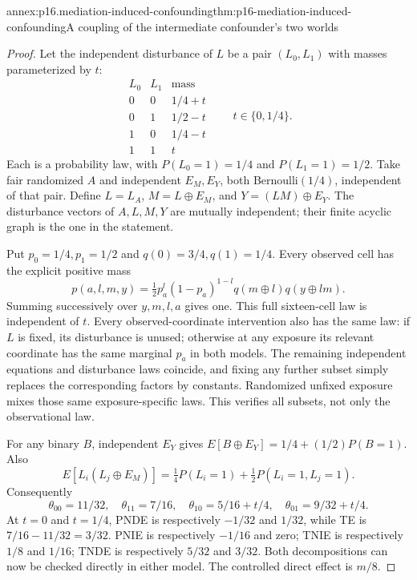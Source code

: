 \begin{annexitem}{annex:p16.mediation-induced-confounding}{thm:p16-mediation-induced-confounding}{A coupling of the intermediate confounder's two worlds}
\begin{proof}
Let the independent disturbance of \(L\) be a pair \((L_0,L_1)\)
with masses parameterized by \(t\):
\[
\begin{array}{cc|c}
 L_0&L_1&\text{mass}\\\hline
 0&0&1/4+t\\0&1&1/2-t\\1&0&1/4-t\\1&1&t
\end{array}
\qquad t\in\{0,1/4\}.
\]
Each is a probability law, with \(P(L_0=1)=1/4\) and
\(P(L_1=1)=1/2\). Take fair randomized \(A\) and independent
\(E_M,E_Y\), both Bernoulli\((1/4)\), independent of that pair.
Define \(L=L_A\), \(M=L\oplus E_M\), and \(Y=(LM)\oplus E_Y\).
The disturbance vectors of \(A,L,M,Y\) are mutually independent;
their finite acyclic graph is the one in the statement.

Put \(p_0=1/4,p_1=1/2\) and \(q(0)=3/4,q(1)=1/4\).
Every observed cell has the explicit positive mass
\[
 p(a,l,m,y)=\tfrac12 p_a^l(1-p_a)^{1-l}
                         q(m\oplus l)q(y\oplus lm).
\]
Summing successively over \(y,m,l,a\) gives one. This full sixteen-cell
law is independent of \(t\). Every observed-coordinate intervention
also has the same law: if \(L\) is fixed, its disturbance is unused;
otherwise at any exposure its relevant coordinate has the same marginal
\(p_a\) in both models. The remaining independent equations and
disturbance laws coincide, and fixing any further subset simply replaces
the corresponding factors by constants. Randomized unfixed exposure
mixes those same exposure-specific laws. This verifies all subsets,
not only the observational law.

For any binary \(B\), independent \(E_Y\) gives
\(E[B\oplus E_Y]=1/4+(1/2)P(B=1)\). Also
\[
 E[L_i(L_j\oplus E_M)]=\tfrac14P(L_i=1)
                              +\tfrac12P(L_i=1,L_j=1).
\]
Consequently
\[
 \theta_{00}=11/32,\quad \theta_{11}=7/16,
 \quad\theta_{10}=5/16+t/4,\quad\theta_{01}=9/32+t/4.
\]
At \(t=0\) and \(t=1/4\), PNDE is respectively \(-1/32\)
and \(1/32\), while TE is \(7/16-11/32=3/32\).
PNIE is respectively \(-1/16\) and zero; TNIE is respectively
\(1/8\) and \(1/16\); TNDE is respectively \(5/32\) and \(3/32\).
Both decompositions can now be checked directly in either model.
The controlled direct effect is \(m/8\).


\end{proof}
\end{annexitem}
